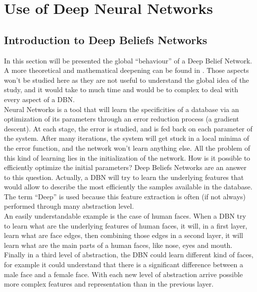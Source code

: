 \documentclass{report}
\begin{document}
	\chapter{Use of Deep Neural Networks}
		
		\section{Introduction to Deep Beliefs Networks}
		
		In this section will be presented the global “behaviour” of a Deep Belief Network. A more theoretical and mathematical deepening can be found in \cite{hinton2006fast}. Those aspects won't be studied here as they are not useful to understand the global idea of the study, and it would take to much time and would be to complex to deal with every aspect of a DBN.\\
		
		Neural Networks is a tool that will learn the specificities of a database via an optimization of its parameters through an error reduction process (a gradient descent). At each stage, the error is studied, and is fed back on each parameter of the system. After many iterations, the system will get stuck in a local minima of the error function, and the network won't learn anything else. All the problem of this kind of learning lies in the initialization of the network. How is it possible to efficiently optimize the initial parameters? Deep Beliefs Networks are an answer to this question. Actually, a DBN will try to learn the underlying features that would allow to describe the most efficiently the samples available in the database. The term “Deep” is used because this feature extraction is often (if not always) performed through many abstraction level.\\
		
		An easily understandable example is the case of human faces. When a DBN try to learn what are the underlying features of human faces, it will, in a first layer, learn what are face edges, then combining those edges in a second layer, it will learn what are the main parts of a human faces, like nose, eyes and mouth. Finally in a third level of abstraction, the DBN could learn different kind of faces, for example it could understand that there is a significant difference between a male face and a female face. With each new level of abstraction arrive possible more complex features and representation than in the previous layer. \\
		
\end{document}
